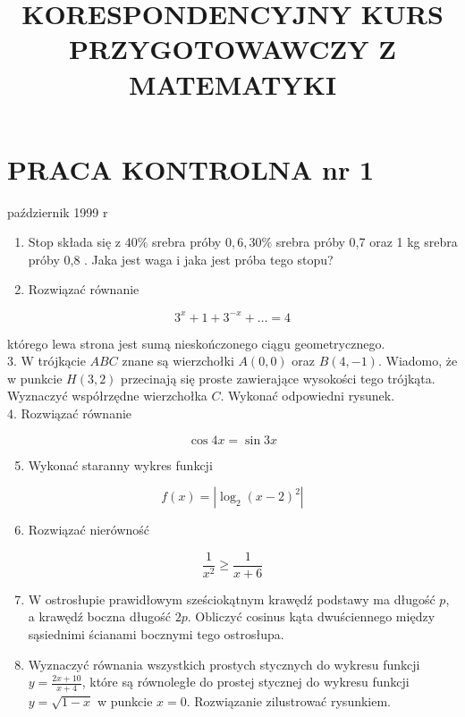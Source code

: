 \documentclass[10pt]{article}
\title{KORESPONDENCYJNY KURS PRZYGOTOWAWCZY Z MATEMATYKI }
\author{}
\date{}
\begin{document}
\maketitle
\section*{PRACA KONTROLNA nr 1}
październik 1999 r

\begin{enumerate}
  \item Stop składa się z $40 \%$ srebra próby $0,6,30 \%$ srebra próby 0,7 oraz 1 kg srebra próby 0,8 . Jaka jest waga i jaka jest próba tego stopu?
  \item Rozwiązać równanie
\end{enumerate}

$$
3^{x}+1+3^{-x}+\ldots=4
$$

którego lewa strona jest sumą nieskończonego ciągu geometrycznego.\\
3. W trójkącie $A B C$ znane są wierzchołki $A(0,0)$ oraz $B(4,-1)$. Wiadomo, że w punkcie $H(3,2)$ przecinają się proste zawierające wysokości tego trójkąta. Wyznaczyć współrzędne wierzchołka $C$. Wykonać odpowiedni rysunek.\\
4. Rozwiązać równanie

$$
\cos 4 x=\sin 3 x
$$

\begin{enumerate}
  \setcounter{enumi}{4}
  \item Wykonać staranny wykres funkcji
\end{enumerate}

$$
f(x)=\left|\log _{2}(x-2)^{2}\right|
$$

\begin{enumerate}
  \setcounter{enumi}{5}
  \item Rozwiązać nierówność
\end{enumerate}

$$
\frac{1}{x^{2}} \geqslant \frac{1}{x+6}
$$

\begin{enumerate}
  \setcounter{enumi}{6}
  \item W ostrosłupie prawidłowym sześciokątnym krawędź podstawy ma długość $p$, a krawędź boczna długość $2 p$. Obliczyć cosinus kąta dwuściennego między sąsiednimi ścianami bocznymi tego ostrosłupa.
  \item Wyznaczyć równania wszystkich prostych stycznych do wykresu funkcji $y=\frac{2 x+10}{x+4}$, które są równoległe do prostej stycznej do wykresu funkcji $y=\sqrt{1-x}$ w punkcie $x=0$. Rozwiązanie zilustrować rysunkiem.
\end{enumerate}
\end{document}
